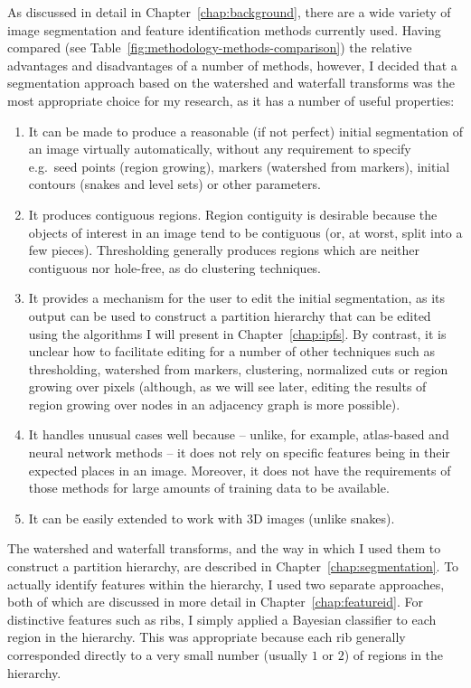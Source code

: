 As discussed in detail in Chapter~\ref{chap:background}, there are a wide variety of image segmentation and feature identification methods currently used. Having compared (see Table~\ref{fig:methodology-methods-comparison}) the relative advantages and disadvantages of a number of methods, however, I decided that a segmentation approach based on the watershed and waterfall transforms was the most appropriate choice for my research, as it has a number of useful properties:
%
\begin{enumerate}

\item It can be made to produce a reasonable (if not perfect) initial segmentation of an image virtually automatically, without any requirement to specify e.g.~seed points (region growing), markers (watershed from markers), initial contours (snakes and level sets) or other parameters.

\item It produces contiguous regions. Region contiguity is desirable because the objects of interest in an image tend to be contiguous (or, at worst, split into a few pieces). Thresholding generally produces regions which are neither contiguous nor hole-free, as do clustering techniques.

\item It provides a mechanism for the user to edit the initial segmentation, as its output can be used to construct a partition hierarchy that can be edited using the algorithms I will present in Chapter~\ref{chap:ipfs}. By contrast, it is unclear how to facilitate editing for a number of other techniques such as thresholding, watershed from markers, clustering, normalized cuts or region growing over pixels (although, as we will see later, editing the results of region growing over nodes in an adjacency graph is more possible).

\item It handles unusual cases well because -- unlike, for example, atlas-based and neural network methods -- it does not rely on specific features being in their expected places in an image. Moreover, it does not have the requirements of those methods for large amounts of training data to be available.

\item It can be easily extended to work with 3D images (unlike snakes).

\end{enumerate}
%
The watershed and waterfall transforms, and the way in which I used them to construct a partition hierarchy, are described in Chapter~\ref{chap:segmentation}. To actually identify features within the hierarchy, I used two separate approaches, both of which are discussed in more detail in Chapter~\ref{chap:featureid}. For distinctive features such as ribs, I simply applied a Bayesian classifier to each region in the hierarchy. This was appropriate because each rib generally corresponded directly to a very small number (usually $1$ or $2$) of regions in the hierarchy.

